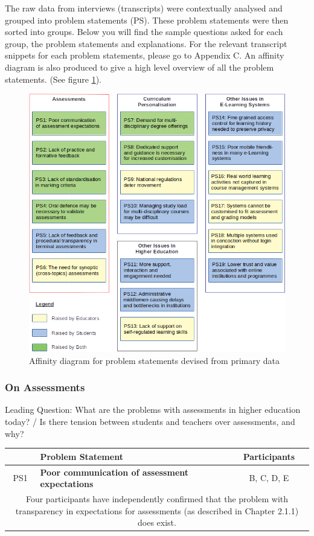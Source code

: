 The raw data from interviews (transcripts) were contextually analysed and grouped into problem statements (PS).
These problem statements were then sorted into groups. Below you will find the sample questions asked for each group,
the problem statements and explanations.
For the relevant transcript snippets for each problem statements, please go to Appendix C.
An affinity diagram is also produced to give a high level overview of all the problem statements.
(See figure \ref{fig:ps-affinity}).
\begin{figure}[!ht]
	\centering
	\includegraphics[width=1.0\textwidth]{ps-affinity}
	\caption[Affinity diagram for primary data]
	{Affinity diagram for problem statements devised from primary data}
	\label{fig:ps-affinity}
\end{figure}

\subsubsection{On Assessments}

Leading Question: What are the problems with assessments in higher education today? /
Is there tension between students and teachers over assessments, and why?
\begin{table}[!ht]
	\begin{tabularx}{\textwidth}{|c|X|c|}
		\hline
		    & Problem Statement                                      & Participants \\
		\hline
		PS1 & \textbf{Poor communication of assessment expectations} & B, C, D, E   \\
		\hline
		\multicolumn{3}{|X|}{Four participants have independently confirmed that the problem with transparency in expectations for
			assessments (as described in Chapter 2.1.1) does exist.}                    \\
		\hline
	\end{tabularx}
\end{table}

